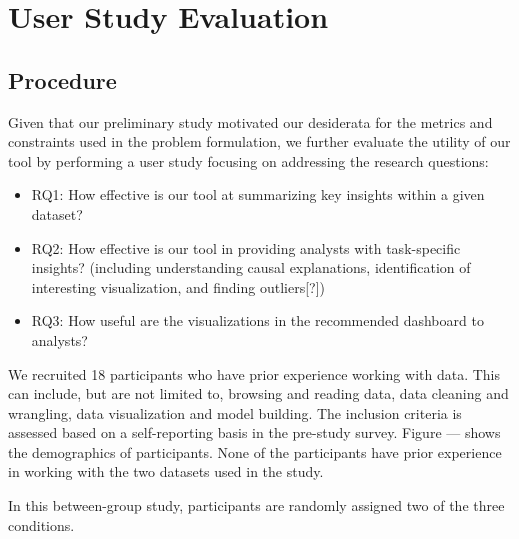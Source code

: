 \section{User Study Evaluation}
\subsection{Procedure}
Given that our preliminary study motivated our desiderata for the metrics and constraints used in the problem formulation, we further evaluate the utility of our tool by performing a user study focusing on addressing the research questions: 
\begin{itemize}
	\item RQ1: How effective is our tool at summarizing key insights within a given dataset?
	\item RQ2: How effective is our tool in providing analysts with task-specific insights? (including understanding causal explanations, identification of interesting visualization, and finding outliers[?])
	\item RQ3: How useful are the visualizations in the recommended dashboard to analysts?
\end{itemize}
\par We recruited 18 participants who have prior experience working with data. This can include, but are not limited to, browsing and reading data, data cleaning and wrangling, data visualization and model building. The inclusion criteria is assessed based on a self-reporting basis in the pre-study survey. Figure --- shows the demographics of participants. None of the participants have prior experience in working with the two datasets used in the study.
\par In this between-group study, participants are randomly assigned two of the three conditions. 
